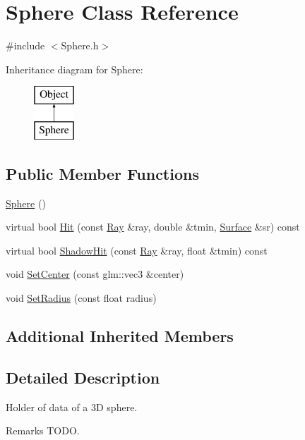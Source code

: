 \hypertarget{class_sphere}{}\section{Sphere Class Reference}
\label{class_sphere}


{\ttfamily \#include $<$Sphere.\+h$>$}

Inheritance diagram for Sphere\+:\begin{figure}[H]
\begin{center}
\leavevmode
\includegraphics[height=2.000000cm]{class_sphere}
\end{center}
\end{figure}
\subsection*{Public Member Functions}
\begin{DoxyCompactItemize}
\item 
\hyperlink{class_sphere_a890a63ff583cb88e7ec4e840b4ef5eb9}{Sphere} ()
\item 
virtual bool \hyperlink{class_sphere_ab568d3aa3eccdd0c691150fc3d5bb86f}{Hit} (const \hyperlink{class_ray}{Ray} \&ray, double \&tmin, \hyperlink{class_surface}{Surface} \&sr) const
\item 
virtual bool \hyperlink{class_sphere_ac3b3cc027f0cd8c89cecc3b65799267d}{Shadow\+Hit} (const \hyperlink{class_ray}{Ray} \&ray, float \&tmin) const
\item 
void \hyperlink{group___geometric_objects_ga2b8aef309428ea904c75ce3300a71e09}{Set\+Center} (const glm\+::vec3 \&center)
\item 
void \hyperlink{group___geometric_objects_ga0377e69b4a636f542c30c6fa977399e3}{Set\+Radius} (const float radius)
\end{DoxyCompactItemize}
\subsection*{Additional Inherited Members}


\subsection{Detailed Description}
Holder of data of a 3D sphere. \begin{DoxyRemark}{Remarks}
T\+O\+DO. 
\end{DoxyRemark}


